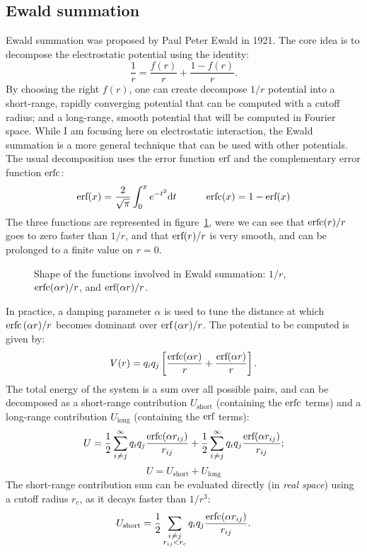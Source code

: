 \documentclass[thesis]{subfiles}
\begin{document}
\subsection{Ewald summation}

Ewald summation was proposed by Paul Peter Ewald in 1921\cite{Ewald1921}. The
core idea is to decompose the electrostatic potential using the identity:
\[ \frac{1}{r} = \frac{f(r)}{r} + \frac{1 - f(r)}{r}. \]
By choosing the right $f(r)$, one can create decompose $1/r$ potential into a
short-range, rapidly converging potential that can be computed with a cutoff
radius; and a long-range, smooth potential that will be computed in Fourier
space. While I am focusing here on electrostatic interaction, the Ewald
summation is a more general technique that can be used with other potentials.
The usual decomposition uses the error function ${\normalfont\text{erf}}$ and the complementary
error function ${\normalfont\text{erfc}}$:
\[{\normalfont\text{erf}}(x) = \frac{2}{\sqrt\pi} \int_0^x e^{-t^2} \text{d} t \hskip3em {\normalfont\text{erfc}}(x) = 1 - {\normalfont\text{erf}}(x)\]
The three functions are represented in figure~\ref{fig:ewald:erf}, were we can
see that ${\normalfont\text{erfc}}(r)/r$ goes to zero faster than $1/r$, and that ${\normalfont\text{erf}}(r)/r$ is
very smooth, and can be prolonged to a finite value on $r = 0$.

\begin{figure}[ht]
    \centering
    
    \caption{Shape of the functions involved in Ewald summation: $1/r$, ${\normalfont\text{erfc}}(\alpha r) / r$,
    and ${\normalfont\text{erf}}(\alpha r) / r$.}
    \label{fig:ewald:erf}
\end{figure}

In practice, a damping parameter $\alpha$ is used to tune the distance at which
${\normalfont\text{erfc}}\,(\alpha r) / r$ becomes dominant over ${\normalfont\text{erf}}\,(\alpha r) / r$. The
potential to be computed is given by:
\[ V(r) = q_i q_j \left[\frac{{\normalfont\text{erfc}}(\alpha r)}{r} + \frac{{\normalfont\text{erf}}(\alpha r)}{r} \right].\]
The total energy of the system is a sum over all possible pairs, and can be
decomposed as a short-range contribution $U_\text{short}$ (containing the
${\normalfont\text{erfc}}$ terms) and a long-range contribution $U_\text{long}$ (containing the
${\normalfont\text{erf}}$ terms):
\[ U = \frac12 \sum_{i\not\kern0.2ex= j}^\infty q_i q_j \frac{{\normalfont\text{erfc}}(\alpha r_{ij})}{r_{ij}} + \frac12 \sum_{i\not\kern0.2ex= j}^\infty q_i q_j \frac{{\normalfont\text{erf}}(\alpha r_{ij})}{r_{ij}};\]
\[ U = U_\text{short} + U_\text{long}\]
The short-range contribution sum can be evaluated directly (in \emph{real
space}) using a cutoff radius $r_c$, as it decays faster than $1/r^3$:
\[ U_\text{short} = \frac12 \sum_{\substack{i\not\kern0.2ex= j \\ r_{ij} < r_c}} q_i q_j \frac{{\normalfont\text{erfc}}(\alpha r_{ij})}{r_{ij}}.\]
\end{document}
